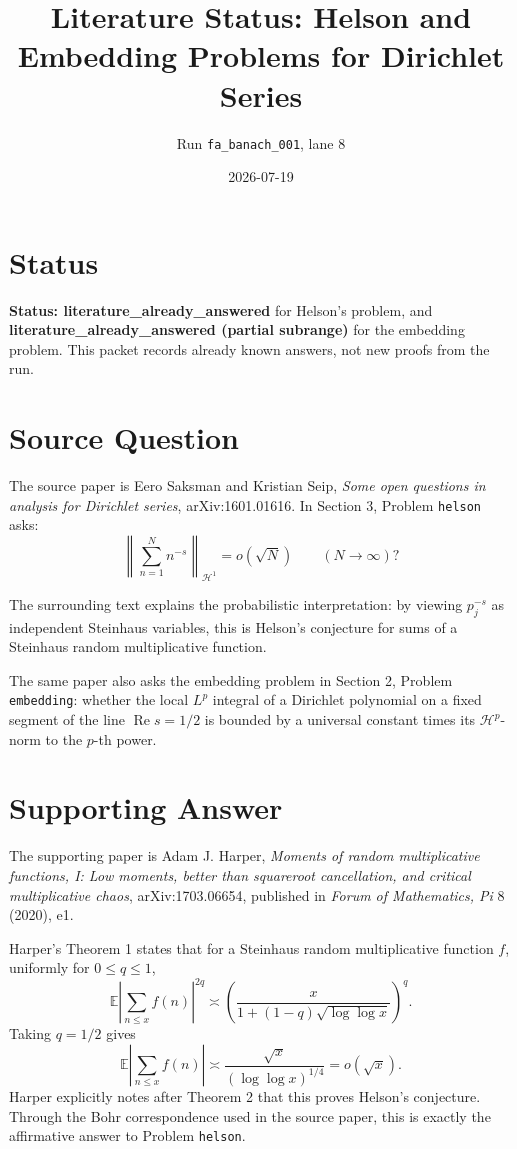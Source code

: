 \documentclass[11pt]{article}
\title{Literature Status: Helson and Embedding Problems for Dirichlet Series}
\author{Run \texttt{fa\_banach\_001}, lane 8}
\date{2026-07-19}
\begin{document}
\maketitle

\section*{Status}

\textbf{Status: literature\_already\_answered} for Helson's problem, and
\textbf{literature\_already\_answered (partial subrange)} for the embedding
problem. This packet records already known answers, not new proofs from the
run.

\section*{Source Question}

The source paper is Eero Saksman and Kristian Seip,
\emph{Some open questions in analysis for Dirichlet series}, arXiv:1601.01616.
In Section 3, Problem \texttt{helson} asks:
\[
  \left\|\sum_{n=1}^N n^{-s}\right\|_{\mathcal H^1}
  = o(\sqrt N)
  \qquad (N\to\infty)?
\]

The surrounding text explains the probabilistic interpretation: by viewing
\(p_j^{-s}\) as independent Steinhaus variables, this is Helson's conjecture for
sums of a Steinhaus random multiplicative function.

The same paper also asks the embedding problem in Section 2, Problem
\texttt{embedding}: whether the local \(L^p\) integral of a Dirichlet
polynomial on a fixed segment of the line \(\operatorname{Re}s=1/2\) is bounded
by a universal constant times its \(\mathcal H^p\)-norm to the \(p\)-th power.

\section*{Supporting Answer}

The supporting paper is Adam J. Harper,
\emph{Moments of random multiplicative functions, I: Low moments, better than
squareroot cancellation, and critical multiplicative chaos}, arXiv:1703.06654,
published in \emph{Forum of Mathematics, Pi} 8 (2020), e1.

Harper's Theorem 1 states that for a Steinhaus random multiplicative function
\(f\), uniformly for \(0\le q\le 1\),
\[
  \mathbb E\left|\sum_{n\le x} f(n)\right|^{2q}
  \asymp
  \left(
    \frac{x}{1+(1-q)\sqrt{\log\log x}}
  \right)^q .
\]
Taking \(q=1/2\) gives
\[
  \mathbb E\left|\sum_{n\le x} f(n)\right|
  \asymp
  \frac{\sqrt x}{(\log\log x)^{1/4}}
  = o(\sqrt x).
\]
Harper explicitly notes after Theorem 2 that this proves Helson's conjecture.
Through the Bohr correspondence used in the source paper, this is exactly the
affirmative answer to Problem \texttt{helson}.
\end{document}
